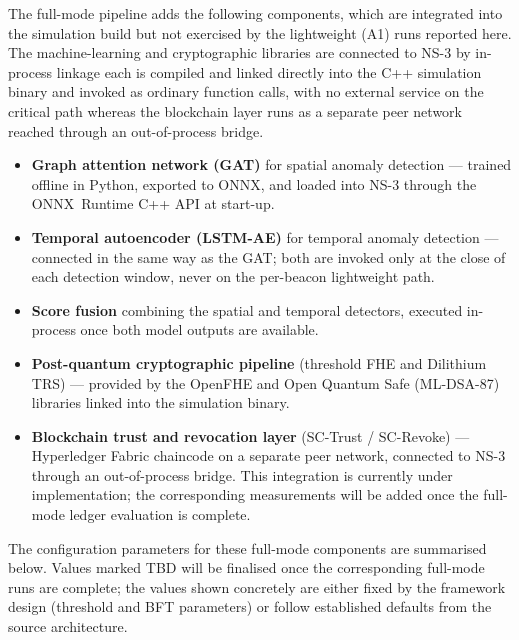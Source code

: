\documentclass[12pt, a4paper]{report}
\begin{document}
The full-mode pipeline adds the following components, which are integrated into
the simulation build but not exercised by the lightweight (A1) runs reported
here. The machine-learning and cryptographic libraries are connected to NS-3 by
in-process linkage each is compiled and linked directly into the C++
simulation binary and invoked as ordinary function calls, with no external
service on the critical path whereas the blockchain layer runs as a separate
peer network reached through an out-of-process bridge.
\begin{itemize}
  \item \textbf{Graph attention network (GAT)} for spatial anomaly detection ---
        trained offline in Python, exported to ONNX, and loaded into NS-3 through
        the ONNX~Runtime C++ API at start-up.
  \item \textbf{Temporal autoencoder (LSTM-AE)} for temporal anomaly detection ---
        connected in the same way as the GAT; both are invoked only at the close
        of each detection window, never on the per-beacon lightweight path.
  \item \textbf{Score fusion} combining the spatial and temporal detectors,
        executed in-process once both model outputs are available.
  \item \textbf{Post-quantum cryptographic pipeline} (threshold FHE and Dilithium
        TRS) --- provided by the OpenFHE and Open Quantum Safe (ML-DSA-87)
        libraries linked into the simulation binary.
  \item \textbf{Blockchain trust and revocation layer} (SC-Trust / SC-Revoke) ---
        Hyperledger Fabric chaincode on a separate peer network, connected to
        NS-3 through an out-of-process bridge. This integration is currently
        under implementation; the corresponding measurements will be added once
        the full-mode ledger evaluation is complete.
\end{itemize}

The configuration parameters for these full-mode components are summarised
below. Values marked TBD will be finalised once the
corresponding full-mode runs are complete; the values shown concretely are
either fixed by the framework design (threshold and BFT parameters) or follow
established defaults from the source architecture.
\end{document}
